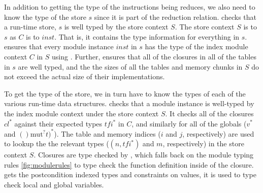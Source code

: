 In addition to getting the type of the instructions being reduces, we also need to know the type of the store $s$ since it is part of the reduction relation.
 checks that a run-time store, $s$ is well typed by the store context $S$.
The store context $S$ is to $s$ as $C$ is to $inst$.
That is, it contains the type information for everything in $s$.
 ensures that every module instance $inst$ in $s$ has the type of the index module context $C$ in $S$ using .
Further,  ensures that all of the closures in all of the tables in $s$ are well typed, and the the sizes of all the tables and memory chunks in $S$ do not exceed the actual size of their implementations.

To get the type of the store, we in turn have to know the types of each of the various run-time data structures.
 checks that a module instance is well-typed by the index module context under the store context $S$.
It checks all of the closures $cl^{*}$ against their expected types $tfi^{*}$ in $C$, and similarly for all of the globals ($v^{*}$ and $()\text{mut}^{?} t)^{*}$).
The table and memory indices ($i$ and $j$, respectively) are used to lookup the the relevant types ($(n,tfi^{*})$ and $m$, respectively) in the store context $S$.
Closures are type checked by , which falls back on the module typing rules \autoref{fig:modulerules} to type check the function definition inside of the closure.
 gets the postcondition indexed types and constraints on values, it is used to type check local and global variables.

